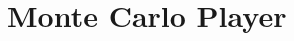 \documentclass[12pt,a4paper,twoside,openright]{book}
\begin{document}







\chapter{Monte Carlo Player}
\label{ch:monte_carlo}



\end{document}

